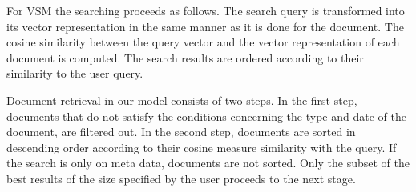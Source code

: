 For VSM the searching proceeds as follows. The search query is transformed into its vector representation in the same manner as it is done for the document. The cosine similarity between the query vector and the vector representation of each document is computed. The search results are ordered according to their similarity to the user query. 

Document retrieval in our model consists of two steps. In the first step, documents that do not satisfy the conditions concerning the type and date of the document, are filtered out. In the second step, documents are sorted in descending order according to their cosine measure similarity with the query. If the search is only on meta data, documents are not sorted. Only the subset of the best results of the size specified by the user proceeds to the next stage.